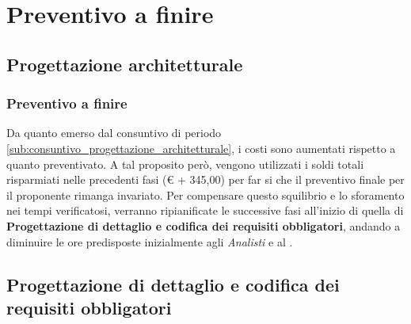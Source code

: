 %


\section{Preventivo a finire} %

	\subsection{Progettazione architetturale} %

		\subsubsection{Preventivo a finire} %
		Da quanto emerso dal consuntivo di periodo \ref{sub:consuntivo_progettazione_architetturale}, i costi sono aumentati rispetto a quanto preventivato. A tal proposito però, vengono utilizzati i soldi totali risparmiati nelle precedenti fasi (\euro{} + 345,00) per far si che il preventivo finale per il proponente rimanga invariato. \newline
		Per compensare questo squilibrio e lo sforamento nei tempi verificatosi, verranno ripianificate le successive fasi all'inizio di quella di \textbf{Progettazione di dettaglio e codifica dei requisiti obbligatori}, andando a diminuire le ore predisposte inizialmente agli \emph{Analisti} e al \roleProjectManager.



	\subsection{Progettazione di dettaglio e codifica dei requisiti obbligatori} %

